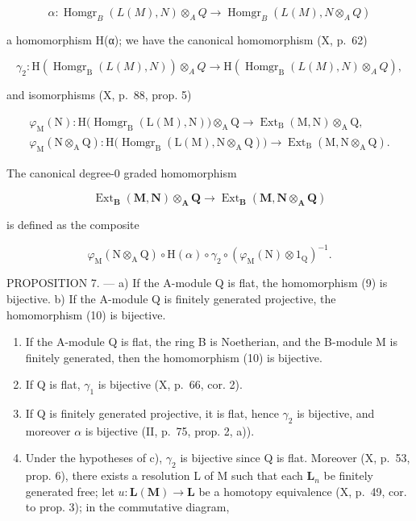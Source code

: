 \[
\alpha : \operatorname{Homgr} _ {B} (L (M), N) \otimes_ {A} Q \rightarrow \operatorname{Homgr} _ {B} (L (M), N \otimes_ {A} Q)
\]

a homomorphism H(α); we have the canonical homomorphism (X, p.~62)

\[
\gamma_ {2}: \mathrm{H} (\operatorname{Homgr} _ {\mathrm{B}} (L (M), N)) \otimes_ {A} Q \rightarrow \mathrm{H} (\operatorname{Homgr} _ {\mathrm{B}} (L (M), N) \otimes_ {A} Q),
\]

and isomorphisms (X, p.~88, prop. 5)

\[
\begin{array}{c} \varphi_ {\mathrm{M}} (\mathrm{N}): \mathrm{H} \big (\operatorname{Homgr} _ {\mathrm{B}} (\mathrm{L} (\mathrm{M}), \mathrm{N}) \big) \otimes_ {\mathrm{A}} \mathrm{Q} \to \operatorname{Ext} _ {\mathrm{B}} (\mathrm{M}, \mathrm{N}) \otimes_ {\mathrm{A}} \mathrm{Q}, \\ \varphi_ {\mathrm{M}} (\mathrm{N} \otimes_ {\mathrm{A}} \mathrm{Q}): \mathrm{H} \big (\operatorname{Homgr} _ {\mathrm{B}} (\mathrm{L} (\mathrm{M}), \mathrm{N} \otimes_ {\mathrm{A}} \mathrm{Q}) \big) \to \operatorname{Ext} _ {\mathrm{B}} (\mathrm{M}, \mathrm{N} \otimes_ {\mathrm{A}} \mathrm{Q}). \end{array}
\]

The canonical degree-0 graded homomorphism

\[
\operatorname{Ext} _ {\mathbf {B}} (\mathbf {M}, \mathbf {N}) \otimes_ {\mathbf {A}} \mathbf {Q} \rightarrow \operatorname{Ext} _ {\mathbf {B}} (\mathbf {M}, \mathbf {N} \otimes_ {\mathbf {A}} \mathbf {Q})\tag{10}
\]

is defined as the composite

\[
\varphi_ {\mathrm{M}} (\mathrm{N} \otimes_ {\mathrm{A}} \mathrm{Q}) \circ \mathrm{H} (\alpha) \circ \gamma_ {2} \circ \left(\varphi_ {\mathrm{M}} (\mathrm{N}) \otimes 1 _ {\mathrm{Q}}\right) ^ {- 1}.
\]

PROPOSITION 7. --- a) If the A-module Q is flat, the homomorphism (9) is bijective. b) If the A-module Q is finitely generated projective, the homomorphism (10) is bijective.

\begin{enumerate}
\def\labelenumi{\alph{enumi})}
\setcounter{enumi}{2}
\item
  If the A-module Q is flat, the ring B is Noetherian, and the B-module M is finitely generated, then the homomorphism (10) is bijective.
\item
  If Q is flat, \(\gamma_{1}\) is bijective (X, p.~66, cor. 2).
\item
  If Q is finitely generated projective, it is flat, hence \(\gamma_{2}\) is bijective, and moreover \(\alpha\) is bijective (II, p.~75, prop. 2, a)).
\item
  Under the hypotheses of c), \(\gamma_{2}\) is bijective since Q is flat. Moreover (X, p.~53, prop. 6), there exists a resolution L of M such that each \(\mathbf{L}_{n}\) be finitely generated free; let \(u: \mathbf{L}(\mathbf{M}) \to \mathbf{L}\) be a homotopy equivalence (X, p.~49, cor. to prop. 3); in the commutative diagram,
\end{enumerate}

